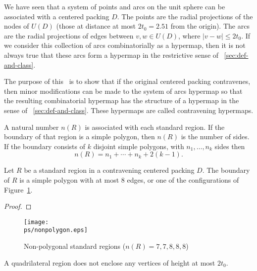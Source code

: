 
We have seen that a system of points and arcs on the unit sphere
can be associated with a centered packing $D$.  The points are the
radial projections of the nodes of $U(D)$ (those at distance at
most $2t_0=2.51$ from the origin).  The arcs are the radial
projections of edges between $v,w\in U(D)$, where $|v-w|\le2t_0$.
If we consider this collection of arcs combinatorially as a
hypermap, then it is not always true that these arcs form a
hypermap in the restrictive sense of
\Chap~\ref{sec:def-and-class}.

The purpose of this \chap\ is to show that if the original
centered packing contravenes, then minor modifications can be made
to the system of arcs hypermap so that the resulting combinatorial
hypermap has the structure of a hypermap in the sense of
\Chap~\ref{sec:def-and-class}. These hypermaps are called
contravening hypermaps.

A natural number $n(R)$ is associated with each standard region. If
the boundary of that region is a simple polygon, then $n(R)$ is the
number of sides.   If the boundary consists of $k$ disjoint simple
polygons, with $n_1,\ldots,n_k$ sides then
    $$n(R) = n_1+\cdots+n_k + 2(k-1).$$

\begin{lemma}\label{cor:std-aggregate-list:bis}
Let $R$ be a standard region in a contravening centered packing
$D$.  The boundary of $R$ is a simple polygon with at most $8$
edges, or one of the configurations of
Figure~\ref{fig:aggregates}.
\end{lemma}

\begin{proof} 
\end{proof}

\begin{figure}[htb]
  \centering
  \texttt{[image: \\ps/nonpolygon.eps]}
  \caption{Non-polygonal standard regions ($n(R)=7,7,8,8,8$)}
  \label{fig:aggregates}
\end{figure}

\begin{lemma}\label{lemma:enclosed:bis} %
A quadrilateral region does not enclose any vertices of height at
most $2t_0$.
\end{lemma}


